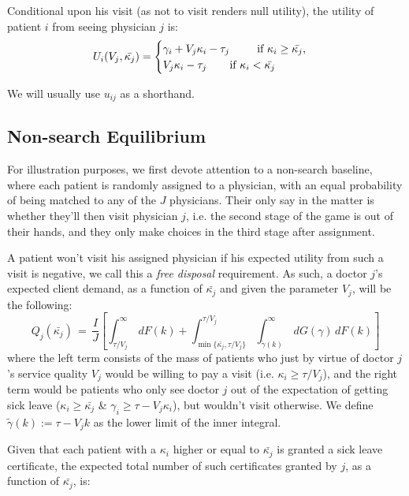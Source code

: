 \documentclass[../main.tex]{subfiles}
\begin{document}
Conditional upon his visit (as not to visit renders null utility), the utility of patient $i$ from seeing physician $j$ is:
\[
    U_i(V_j,\bar{\kappa_j}) =\begin{cases}
    \gamma_i + V_j \kappa_i - \tau_j \text{  \hspace{0.65cm} if $\kappa_i \geq \bar{\kappa_j}$,} \\
    V_j \kappa_i - \tau_j \text{  \hspace{0.5cm} if $\kappa_i < \bar{\kappa_j}$}
    \end{cases}
\]

We will usually use $u_{ij}$ as a shorthand.

\subsection{Non-search Equilibrium}

For illustration purposes, we first devote attention to a non-search baseline, where each patient is randomly assigned to a physician, with an equal probability of being matched to any of the $J$ physicians. Their only say in the matter is whether they'll then visit physician $j$, i.e. the second stage of the game is out of their hands, and they only make choices in the third stage after assignment.

A patient won't visit his assigned physician if his expected utility from such a visit is negative, we call this a \textit{free disposal} requirement. As such, a doctor $j$’s expected client demand, as a function of $\bar{\kappa_j}$ and given the parameter $V_j$, will be the following:
\begin{equation}
    Q_j(\bar{\kappa_j}) \,=\, \frac{I}{J}\left[ \int_{\tau/V_j}^{\infty}\,dF(k) +  \int_{\min\{\bar{\kappa_j},\tau/V_j\}}^{\tau/V_j} \int_{\tilde{\gamma}(k)}^{\infty} \,dG(\gamma) \,dF(k) \right] \tag{N.1}\label{eq:ns_Q}
\end{equation}
where the left term consists of the mass of patients who just by virtue of doctor $j$’s service quality $V_j$ would be willing to pay a visit (i.e. $\kappa_i \geq \tau/V_j$), and the right term would be patients who only see doctor $j$ out of the expectation of getting sick leave ($\kappa_i \geq \bar{\kappa_j}$ \& $\gamma_i \geq \tau - V_j \kappa_i$), but wouldn’t visit otherwise. We define $\tilde{\gamma}(k) := \tau - V_j k$ as the lower limit of the inner integral.

Given that each patient with a $\kappa_i$ higher or equal to $\bar{\kappa_j}$ is granted a sick leave certificate, the expected total number of such certificates granted by $j$, as a function of $\bar{\kappa_j}$, is:
\end{document}
